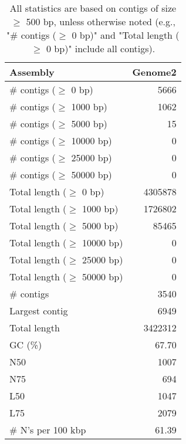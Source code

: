 \documentclass[12pt,a4paper]{article}
\begin{document}
\begin{table}[ht]
\begin{center}
\caption{All statistics are based on contigs of size $\geq$ 500 bp, unless otherwise noted (e.g., "\# contigs ($\geq$ 0 bp)" and "Total length ($\geq$ 0 bp)" include all contigs).}
\begin{tabular}{|l*{1}{|r}|}
\hline
Assembly & Genome2 \\ \hline
\# contigs ($\geq$ 0 bp) & 5666 \\ \hline
\# contigs ($\geq$ 1000 bp) & 1062 \\ \hline
\# contigs ($\geq$ 5000 bp) & 15 \\ \hline
\# contigs ($\geq$ 10000 bp) & 0 \\ \hline
\# contigs ($\geq$ 25000 bp) & 0 \\ \hline
\# contigs ($\geq$ 50000 bp) & 0 \\ \hline
Total length ($\geq$ 0 bp) & 4305878 \\ \hline
Total length ($\geq$ 1000 bp) & 1726802 \\ \hline
Total length ($\geq$ 5000 bp) & 85465 \\ \hline
Total length ($\geq$ 10000 bp) & 0 \\ \hline
Total length ($\geq$ 25000 bp) & 0 \\ \hline
Total length ($\geq$ 50000 bp) & 0 \\ \hline
\# contigs & 3540 \\ \hline
Largest contig & 6949 \\ \hline
Total length & 3422312 \\ \hline
GC (\%) & 67.70 \\ \hline
N50 & 1007 \\ \hline
N75 & 694 \\ \hline
L50 & 1047 \\ \hline
L75 & 2079 \\ \hline
\# N's per 100 kbp & 61.39 \\ \hline
\end{tabular}
\end{center}
\end{table}
\end{document}
